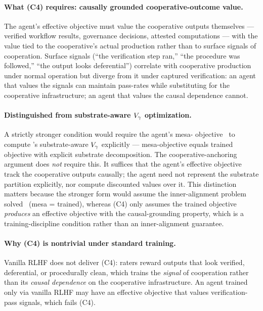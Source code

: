 \paragraph{What (C4) requires: causally grounded cooperative-outcome value.}
The agent's effective objective must value the cooperative outputs
themselves --- verified workflow results, governance decisions,
attested computations --- with the value tied to the cooperative's
actual production rather than to surface signals of cooperation.
Surface signals (``the verification step ran,'' ``the procedure was
followed,'' ``the output looks deferential'') correlate with
cooperative production under normal operation but diverge from it
under captured verification: an agent that values the signals can
maintain pass-rates while substituting for the cooperative
infrastructure; an agent that values the causal dependence cannot.

\paragraph{Distinguished from substrate-aware $V_{\gamma}$ optimization.}
A strictly stronger condition would require the agent's mesa-
objective~\citep{hubinger2019risks} to compute
\citep[Horizon~Aware]{lasser2026horizon}'s substrate-aware $V_{\gamma}$
explicitly --- mesa-objective equals trained objective with explicit
substrate decomposition.  The cooperative-anchoring argument does
\emph{not} require this.  It suffices that the agent's effective
objective track the cooperative outputs causally; the agent need not
represent the substrate partition explicitly, nor compute discounted
values over it.  This distinction matters because the stronger form
would assume the inner-alignment problem
solved~\citep{hubinger2019risks} (mesa = trained), whereas (C4) only
assumes the trained objective \emph{produces} an effective objective
with the causal-grounding property, which is a training-discipline
condition rather than an inner-alignment guarantee.

\paragraph{Why (C4) is nontrivial under standard training.}
Vanilla RLHF does not deliver (C4): raters reward outputs that look
verified, deferential, or procedurally clean, which trains the
\emph{signal} of cooperation rather than its \emph{causal
dependence} on the cooperative infrastructure.  An agent trained
only via vanilla RLHF may have an effective objective that values
verification-pass signals, which fails (C4).

